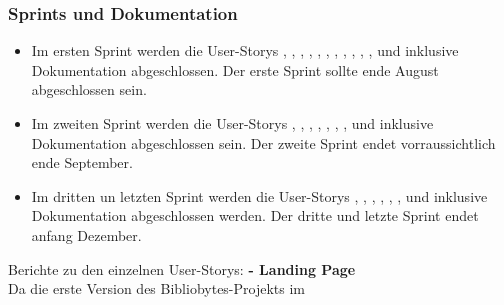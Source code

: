             \subsubsection{Sprints und Dokumentation}
            \begin{itemize}
                \item Im ersten Sprint werden die User-Storys
                    , 
                    , 
                    , 
                    , 
                    , 
                    , 
                    , 
                    , 
                    , 
                    , 
                    , 
                    und
                    inklusive Dokumentation abgeschlossen. Der
                    erste Sprint sollte ende August abgeschlossen sein.
                \item Im zweiten Sprint werden die User-Storys
                    ,
                    ,
                    ,
                    ,
                    ,
                    ,
                    ,
                    und
                    inklusive
                    Dokumentation abgeschlossen sein. Der zweite Sprint endet
                    vorraussichtlich ende September.
                \item Im dritten un letzten Sprint werden die User-Storys
                    ,
                    ,
                    ,
                    ,
                    ,
                    ,
                    und
                    inklusive
                    Dokumentation abgeschlossen werden. Der dritte und letzte
                    Sprint endet anfang Dezember.
            \end{itemize}
        Berichte zu den einzelnen User-Storys:\newline
        \textbf{ - Landing Page}\\
            Da die erste Version des Bibliobytes-Projekts im
